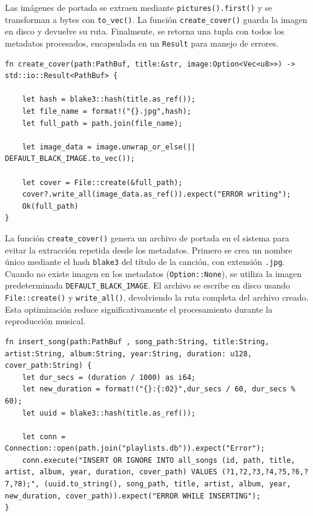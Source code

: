 \documentclass[11pt, a4paper]{article}
\begin{document}
            Las imágenes de portada se extraen mediante \texttt{pictures().first()} y se transforman a bytes con \texttt{to\_vec()}. La función \texttt{create\_cover()} guarda la imagen en disco y devuelve su ruta. Finalmente, se retorna una tupla con todos los metadatos procesados, encapsulada en un \texttt{Result} para manejo de errores.

            \begin{lstlisting}[caption={fn create\_cover()}]
fn create_cover(path:PathBuf, title:&str, image:Option<Vec<u8>>) -> std::io::Result<PathBuf> {

    let hash = blake3::hash(title.as_ref());
    let file_name = format!("{}.jpg",hash);
    let full_path = path.join(file_name);

    let image_data = image.unwrap_or_else(|| DEFAULT_BLACK_IMAGE.to_vec());

    let cover = File::create(&full_path);
    cover?.write_all(image_data.as_ref()).expect("ERROR writing");
    Ok(full_path)
}
            \end{lstlisting}

            La función \texttt{create\_cover()} genera un archivo de portada en el sistema para evitar la extracción repetida desde los metadatos. Primero se crea un nombre único mediante el hash \texttt{blake3} del título de la canción, con extensión \texttt{.jpg}. Cuando no existe imagen en los metadatos (\texttt{Option::None}), se utiliza la imagen predeterminada \texttt{DEFAULT\_BLACK\_IMAGE}. El archivo se escribe en disco usando \texttt{File::create()} y \texttt{write\_all()}, devolviendo la ruta completa del archivo creado. Esta optimización reduce significativamente el procesamiento durante la reproducción musical.

            \begin{lstlisting}[caption={fn insert\_song()}]
fn insert_song(path:PathBuf , song_path:String, title:String, artist:String, album:String, year:String, duration: u128, cover_path:String) {
    let dur_secs = (duration / 1000) as i64;
    let new_duration = format!("{}:{:02}",dur_secs / 60, dur_secs % 60);
    let uuid = blake3::hash(title.as_ref());

    let conn = Connection::open(path.join("playlists.db")).expect("Error");
    conn.execute("INSERT OR IGNORE INTO all_songs (id, path, title, artist, album, year, duration, cover_path) VALUES (?1,?2,?3,?4,?5,?6,?7,?8);", (uuid.to_string(), song_path, title, artist, album, year, new_duration, cover_path)).expect("ERROR WHILE INSERTING");
}
            \end{lstlisting}
\end{document}
